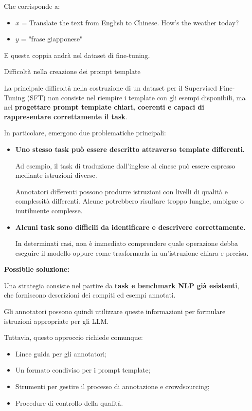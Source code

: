 Che corrisponde a:
\begin{itemize}
    \item $x$ = Translate the text from English to Chinese. How's the weather today?
    \item $y$ = "frase giapponese"
\end{itemize}
E questa coppia andrà nel dataset di fine-tuning.



\begin{observation}{Difficoltà nella creazione dei prompt template}

La principale difficoltà nella costruzione di un dataset per il
Supervised Fine-Tuning (SFT) non consiste nel riempire i template
con gli esempi disponibili, ma nel \textbf{progettare prompt template
chiari, coerenti e capaci di rappresentare correttamente il task}.

In particolare, emergono due problematiche principali:

\begin{itemize}
    \item \textbf{Uno stesso task può essere descritto attraverso
    template differenti.}

    Ad esempio, il task di traduzione dall'inglese al cinese può
    essere espresso mediante istruzioni diverse.

    Annotatori differenti possono produrre istruzioni con livelli
    di qualità e complessità differenti. Alcune potrebbero risultare
    troppo lunghe, ambigue o inutilmente complesse.

    \item \textbf{Alcuni task sono difficili da identificare
    e descrivere correttamente.}

    In determinati casi, non è immediato comprendere quale
    operazione debba eseguire il modello oppure come trasformarla
    in un'istruzione chiara e precisa.
\end{itemize}

\textbf{Possibile soluzione:}

Una strategia consiste nel partire da \textbf{task e benchmark NLP
già esistenti}, che forniscono descrizioni dei compiti ed esempi
annotati.

Gli annotatori possono quindi utilizzare queste informazioni
per formulare istruzioni appropriate per gli LLM.

Tuttavia, questo approccio richiede comunque:

\begin{itemize}
    \item Linee guida per gli annotatori;
    \item Un formato condiviso per i prompt template;
    \item Strumenti per gestire il processo di annotazione
    e crowdsourcing;
    \item Procedure di controllo della qualità.
\end{itemize}


\end{observation}
